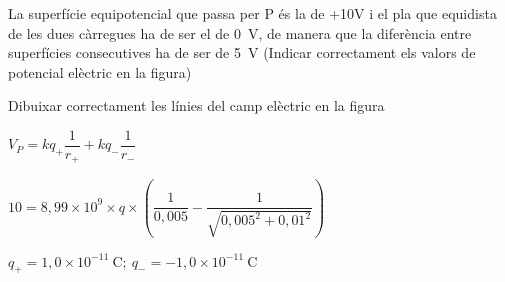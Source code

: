 \begin{solapartat}
La superfície equipotencial que passa per P és la de +10V i el pla que equidista de les dues càrregues ha de ser el de 0~V, de manera que la diferència entre superfícies consecutives ha de ser de 5~V  (Indicar correctament els valors de potencial elèctric en la figura)

Dibuixar correctament les línies del camp elèctric en la figura 

\end{solapartat}

\begin{solapartat}
 $V_P = kq_+\dfrac{1}{r_+} + kq_-\dfrac{1}{r_-}$

 $10 = 8,99\times 10^{9}\times q\times\left(\dfrac{1}{0,005} - \dfrac{1}{\sqrt{0,005^2 + 0,01^2}}\right)$

 $q_+ = 1,0\times 10^{-11}\ \mathrm{C};\ q_- = -1,0\times 10^{-11}\ \mathrm{C}$
\end{solapartat}
